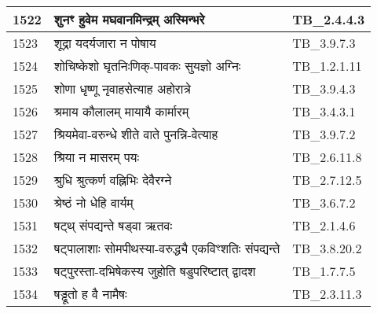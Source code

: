 \documentclass[17pt]{extarticle}
\begin{document}
\begin{longtable}{||p{0.4in}||p{4.9in}||p{0.9in}||}
    1522 & शुनꣳ हुवेम मघवानमिन्द्रम् अस्मिन्भरे & TB\_2.4.4.3       \\
    
    \hline
        
    1523 & शूद्रा यदर्यजारा न पोषाय & TB\_3.9.7.3       \\
    
    \hline
        
    1524 & शोचिष्केशो घृतनिःणिक्{-}पावकः सुयज्ञो अग्निः & TB\_1.2.1.11       \\
    
    \hline
        
    1525 & शोणा धृष्णू नृवाहसेत्याह अहोरात्रे & TB\_3.9.4.3       \\
    
    \hline
        
    1526 & श्रमाय कौलालम् मायायै कार्मारम् & TB\_3.4.3.1       \\
    
    \hline
        
    1527 & श्रियमेवा{-}वरुन्धे शीते वाते पुनन्नि{-}वेत्याह & TB\_3.9.7.2       \\
    
    \hline
        
    1528 & श्रिया न मासरम् पयः & TB\_2.6.11.8       \\
    
    \hline
        
    1529 & श्रुधि श्रुत्कर्ण वह्निभिः देवैरग्ने & TB\_2.7.12.5       \\
    
    \hline
        
    1530 & श्रेष्ठं नो धेहि वार्यम् & TB\_3.6.7.2       \\
    
    \hline
        
    1531 & षट्थ् संपद्यन्ते षड्वा ऋतवः & TB\_2.1.4.6       \\
    
    \hline
        
    1532 & षट्पालाशाः सोमपीथस्या{-}वरुद्ध्यै एकविꣳशतिः संपद्यन्ते & TB\_3.8.20.2       \\
    
    \hline
        
    1533 & षट्पुरस्ता{-}दभिषेकस्य जुहोति षडुपरिष्टात् द्वादश & TB\_1.7.7.5       \\
    
    \hline
        
    1534 & षड्ढूतो ह वै नामैषः & TB\_2.3.11.3       \\
    

\end{longtable}
\end{document}
